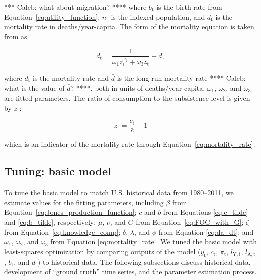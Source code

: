 \documentclass[letterpaper,12pt]{article}
\begin{document}
\noindent **** Caleb: what about migration? **** where $b_\mathrm{t}$ is the birth rate from Equation~\ref{eq:utility_function}, $n_\mathrm{t}$ is the indexed population, and $d_\mathrm{t}$ is the mortality rate in deaths/year-capita. The form of the mortality equation is taken from \citet{Jones:2001wn} as

\begin{equation} \label{eq:mortality_rate}
	d_\mathrm{t} = \frac{1}{\omega_\mathrm{1} z_\mathrm{t}^{\omega_\mathrm{2}} + \omega_\mathrm{3} z_\mathrm{t}} + \bar d,
\end{equation}

\noindent where $d_\mathrm{t}$ is the mortality rate and $\bar d$ is the long-run mortality rate **** Caleb: what is the value of $\bar{d}$? ****, both in units of deaths/year-capita. $\omega_\mathrm{1}$, $\omega_\mathrm{2}$, and $\omega_\mathrm{3}$ are fitted parameters. The ratio of consumption to the subsistence level is given by $z_\mathrm{t}$:

\begin{equation} \label{eq:z}
	z_\mathrm{t} = \frac{c_\mathrm{t}}{\bar c} - 1
\end{equation}

\noindent which is an indicator of the mortality rate through Equation~\ref{eq:mortality_rate}.

\subsection{Tuning: basic model}
\label{sec:basic_model_tuning}

To tune the basic model to match U.S. historical data from 1980--2011, we estimate values for the fitting parameters, including $\beta$ from Equation~\ref{eq:Jones_production_function}; $\bar c$ and $\bar b$ from Equations \ref{eq:c_tilde} and \ref{eq:b_tilde}, respectively; $\mu$, $\nu$, and $G$ from Equation~\ref{eq:FOC_with_G}; $\zeta$ from Equation~\ref{eq:knowledge_comp}; $\delta$, $\lambda$, and $\phi$ from Equation \ref{eq:da_dt}; and $\omega_1$, $\omega_2$, and $\omega_3$ from Equation \ref{eq:mortality_rate}. We tuned the basic model with least-squares optimization by comparing outputs of the model ($y_\mathrm{t}$, $c_\mathrm{t}$, $\pi_\mathrm{t}$, $l_\mathrm{Y,t}$, $l_\mathrm{A,t}$, $b_{\mathrm{t}}$, and $d_\mathrm{t}$) to historical data. The following subsections discuss historical data, development of ``ground truth'' time series, and the parameter estimation process.
\end{document}

